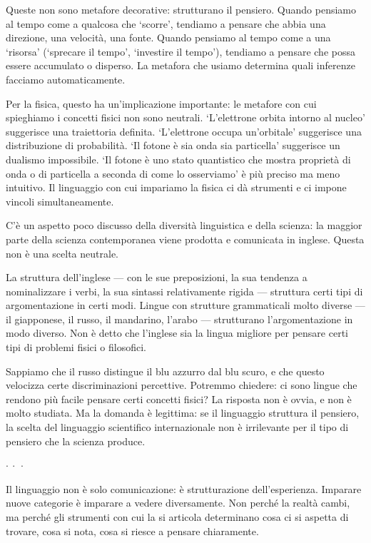\documentclass[12pt,a4paper,openany]{book}
\newcommand{\sezione}[1]{\vspace{1.2em}{\large\bfseries #1}\vspace{0.5em}\par}
\newcommand{\puntini}{\begin{center}$\cdot\ \cdot\ \cdot$\end{center}\vspace{0.3em}}
\begin{document}
Queste non sono metafore decorative: strutturano il pensiero. Quando pensiamo al tempo come a qualcosa che `scorre', tendiamo a pensare che abbia una direzione, una velocità, una fonte. Quando pensiamo al tempo come a una `risorsa' (`sprecare il tempo', `investire il tempo'), tendiamo a pensare che possa essere accumulato o disperso. La metafora che usiamo determina quali inferenze facciamo automaticamente.

Per la fisica, questo ha un'implicazione importante: le metafore con cui spieghiamo i concetti fisici non sono neutrali. `L'elettrone orbita intorno al nucleo' suggerisce una traiettoria definita. `L'elettrone occupa un'orbitale' suggerisce una distribuzione di probabilità. `Il fotone è sia onda sia particella' suggerisce un dualismo impossibile. `Il fotone è uno stato quantistico che mostra proprietà di onda o di particella a seconda di come lo osserviamo' è più preciso ma meno intuitivo. Il linguaggio con cui impariamo la fisica ci dà strumenti e ci impone vincoli simultaneamente.

\sezione{La lingua madre e il pensiero scientifico}

C'è un aspetto poco discusso della diversità linguistica e della scienza: la maggior parte della scienza contemporanea viene prodotta e comunicata in inglese. Questa non è una scelta neutrale.

La struttura dell'inglese --- con le sue preposizioni, la sua tendenza a nominalizzare i verbi, la sua sintassi relativamente rigida --- struttura certi tipi di argomentazione in certi modi. Lingue con strutture grammaticali molto diverse --- il giapponese, il russo, il mandarino, l'arabo --- strutturano l'argomentazione in modo diverso. Non è detto che l'inglese sia la lingua migliore per pensare certi tipi di problemi fisici o filosofici.

Sappiamo che il russo distingue il blu azzurro dal blu scuro, e che questo velocizza certe discriminazioni percettive. Potremmo chiedere: ci sono lingue che rendono più facile pensare certi concetti fisici? La risposta non è ovvia, e non è molto studiata. Ma la domanda è legittima: se il linguaggio struttura il pensiero, la scelta del linguaggio scientifico internazionale non è irrilevante per il tipo di pensiero che la scienza produce.

\puntini

Il linguaggio non è solo comunicazione: è strutturazione dell'esperienza. Imparare nuove categorie è imparare a vedere diversamente. Non perché la realtà cambi, ma perché gli strumenti con cui la si articola determinano cosa ci si aspetta di trovare, cosa si nota, cosa si riesce a pensare chiaramente.
\end{document}
